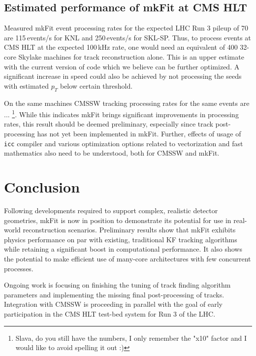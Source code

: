 \documentclass{webofc}
\def\mkfit{mkFit\xspace}
\def\stt#1{{\small\texttt{#1}}}
\begin{document}
\subsection{Estimated performance of \mkfit at CMS HLT}

Measured \mkfit event processing rates for the expected LHC Run 3 pileup of 70
are 115\,events/s for KNL and 250\,events/s for SKL-SP. Thus, to process events
at CMS HLT at the expected 100\,kHz rate, one would need an equivalent of 400
32-core Skylake machines for track reconstruction alone. This is an upper
estimate with the current version of code which we believe can be further
optimized. A significant increase in speed could also be achieved by not
processing the seeds with estimated $p_T$ below certain threshold.

On the same machines CMSSW tracking processing rates for the same events are ... \footnote{Slava, do
  you still have the numbers, I only remember the "x10" factor and I would
  like to avoid spelling it out :)}.  While this indicates \mkfit brings
significant improvements in processing rates, this result should be deemed
preliminary, especially since track post-processing has not yet been
implemented in \mkfit. Further, effects of usage of \stt{icc} compiler and 
various optimization options related to vectorization and fast mathematics 
also need to be understood, both for CMSSW and \mkfit.


\section{Conclusion}

Following developments required to support complex, realistic detector
geometries, \mkfit is now in position to demonstrate its potential for use in
real-world reconstruction scenarios. Preliminary results show that \mkfit
exhibits physics performance on par with existing, traditional KF tracking
algorithms while retaining a significant boost in computational
performance. It also shows the potential to make efficient use of many-core
architectures with few concurrent processes.

Ongoing work is focusing on finishing the tuning of track finding algorithm
parameters and implementing the missing final post-processing of
tracks. Integration with CMSSW is proceeding in parallel with the goal of
early participation in the CMS HLT test-bed system for Run 3 of the LHC.
\end{document}
